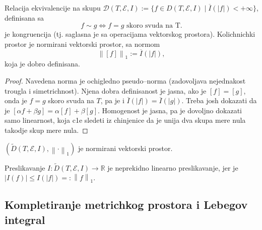\documentclass[a4paper,12pt]{article}
\newcommand{\RR}{\mathbb{R}}
\newcommand{\norm}[1]{\left\lVert#1\right\rVert}
\begin{document}
\begin{lema}
	Relacija ekvivalencije na skupu 
	$\mathcal D (T,\mathcal{E}, I) := \{f \in D(T,\mathcal E, I) \mid \overline{I}(|f|)< +\infty\}$,
	definisana sa 
	\[ f \sim g \iff f = g \text{ skoro svuda na T} .\] 
	je kongruencija (tj. saglasna je sa operacijama vektorskog prostora). Kolichnichki prostor je 
	normirani vektorski prostor, sa normom
	\[ \norm{[f]}_1 := \overline{I}(|f|) ,\] 
	koja je dobro definisana.
\end{lema}
\begin{proof}
	Navedena norma je ochigledno pseudo--norma (zadovoljava nejednakost trougla i simetrichnost). Njena dobra definisanost 
	je jasna, ako je $[f] = [g]$, onda je $f = g$ skoro svuda na $T$, pa je i $\overline{I}(|f|) = \overline{I}(|g|)$.
	Treba josh dokazati da je $[\alpha f + \beta g] = \alpha [f] + \beta [g]$. Homogenost je jasna, pa je dovoljno dokazati
	samo linearnost, koja c1e sledeti iz chinjenice da je unija dva skupa mere nula takodje skup mere nula.
\end{proof}
\begin{posl}
	$(\widetilde{D} (T,\mathcal{E}, I), \norm{\cdot}_1)$ je normirani vektorski prostor.
\end{posl}

\begin{nap}
	Preslikavanje $I:\widetilde{D} (T,\mathcal{E}, I) \to \RR$ je neprekidno linearno preslikavanje,
	jer je $|I(f)| \leq I(|f|) =:\norm{f}_1$.
\end{nap}

\subsection{Kompletiranje metrichkog prostora i Lebegov integral}
\end{document}
